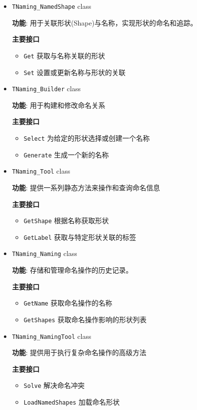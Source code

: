 \documentclass[11pt]{article}
\begin{document}
\begin{itemize}
\item \texttt{TNaming\_NamedShape} class

\textbf{功能}: 用于关联形状(Shape)与名称，实现形状的命名和追踪。

\textbf{主要接口}

\begin{itemize}
\item \texttt{Get} 获取与名称关联的形状
\item \texttt{Set} 设置或更新名称与形状的关联
\end{itemize}

\item \texttt{TNaming\_Builder} class

\textbf{功能}: 用于构建和修改命名关系

\textbf{主要接口}

\begin{itemize}
\item \texttt{Select} 为给定的形状选择或创建一个名称
\item \texttt{Generate} 生成一个新的名称
\end{itemize}

\item \texttt{TNaming\_Tool} class

\textbf{功能}: 提供一系列静态方法来操作和查询命名信息

\textbf{主要接口}

\begin{itemize}
\item \texttt{GetShape} 根据名称获取形状
\item \texttt{GetLabel} 获取与特定形状关联的标签
\end{itemize}

\item \texttt{TNaming\_Naming} class

\textbf{功能}: 存储和管理命名操作的历史记录。

\textbf{主要接口}

\begin{itemize}
\item \texttt{GetName} 获取命名操作的名称
\item \texttt{GetShapes} 获取命名操作影响的形状列表
\end{itemize}

\item \texttt{TNaming\_NamingTool} class

\textbf{功能}: 提供用于执行复杂命名操作的高级方法

\textbf{主要接口}

\begin{itemize}
\item \texttt{Solve} 解决命名冲突
\item \texttt{LoadNamedShapes} 加载命名形状
\end{itemize}
\end{itemize}
\end{document}
